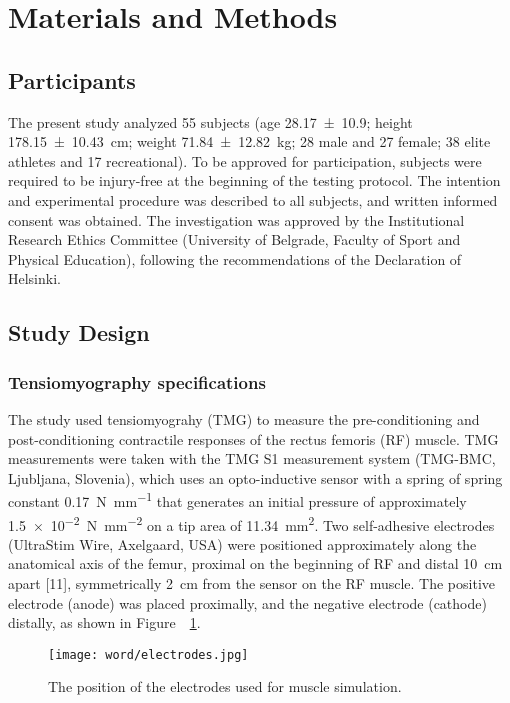 \documentclass[utf8]{style/FrontiersinHarvard}
\begin{document}
\section{Materials and Methods}
\subsection{Participants}
The present study analyzed 55 subjects (age \SI{28.17 \pm 10.9}{\year}; height \SI{178.15 \pm 10.43}{\centi \meter}; weight \SI{71.84 \pm 12.82}{\kilogram}; 28 male and 27 female; 38 elite athletes and 17 recreational).
To be approved for participation, subjects were required to be injury-free at the beginning of the testing protocol.
The intention and experimental procedure was described to all subjects, and written informed consent was obtained.
The investigation was approved by the Institutional Research Ethics Committee (University of Belgrade, Faculty of Sport and Physical Education), following the recommendations of the Declaration of Helsinki.

\subsection{Study Design}

\subsubsection{Tensiomyography specifications}
The study used tensiomyograhy (TMG) to measure the pre-conditioning and post-conditioning contractile responses of the rectus femoris (RF) muscle.
TMG measurements were taken with the TMG S1 measurement system (TMG-BMC, Ljubljana, Slovenia), which uses an opto-inductive sensor with a spring of spring constant \SI{0.17}{\newton \per \milli \meter} that generates an initial pressure of approximately \SI{1.5e-2}{\newton \per \milli \meter \squared} on a tip area of \SI{11.34}{\milli \meter \squared}.
Two self-adhesive electrodes (UltraStim\textregistered{} Wire, Axelgaard, USA) were positioned approximately along the anatomical axis of the femur, proximal on the beginning of RF and distal \SI{10}{\centi \meter} apart [11], symmetrically \SI{2}{\centi \meter} from the sensor on the RF muscle.
The positive electrode (anode) was placed proximally, and the negative electrode (cathode) distally, as shown in Figure~~\ref{fig:electrodes}.

\begin{figure}[htb!]
	\centering
    \texttt{[image: word/electrodes.jpg]}
    \caption{The position of the electrodes used for muscle simulation.}
    \label{fig:electrodes}
\end{figure}
\end{document}
